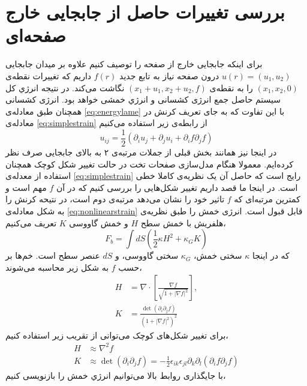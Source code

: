 \section{بررسی تغییرات حاصل از جابجایی خارج صفحه‌ای}
برای اینکه جابجایی خارج از صفحه را توصیف کنیم علاوه بر میدان جابجایی 
$u(r)=(u_1,u_2)$
درون صفحه نیاز به تابع جدید 
$f(r)$
داریم که تغییرات نقطه‌ی 
$(x_1,x_2,0)$
را به نقطه‌ی 
$(x_1+u_1,x_2+u_2,f)$
نگاشت می‌کند. در نتیجه انرژي کل سیستم حاصل جمع انرژی کشسانی و انرژي خمشی خواهد بود. انرژی کشسانی همچنان طبق معادله‌ی
\ref{eq:energylame}
با این تفاوت که به جای تعریف کرنش در معادله‌ی 
\ref{eq:simplestrain}
از رابطه‌ی زیر استفاده می‌کنیم
\begin{equation}
u_{ij}=\frac{1}{2}(\partial_iu_j+\partial_ju_i+\partial_if\partial_jf)
\label{eq:nonlinearstrain}
\end{equation}
در اینجا نیز همانند بخش قبلی از جملات مرتبه‌ی ۲ به بالای جابجایی صرف نظر کرده‌ایم. معمولا هنگام  مدل‌سازی صفحات تخت در حالت تغییر شکل کوچک همچنان استفاده از معدله‌ی 
\ref{eq:simplestrain}
رایج است که حاصل آن یک نظریه‌ی کاملا خطی است. در اینجا ما قصد داریم تغییر شکل‌هایی را بررسی کنیم که در آن $f$ مهم است و کمترین مرتبه‌ای که $f$ 
تاثیر خود را نشان می‌دهد مرتبه‌ی دوم است، در نتیحه کرنش را به شکل  معادله‌ی 
\ref{eq:nonlinearstrain}
قابل قبول است. انرژی خمش را طبق نظریه‌ی هلفریش
\cite{Helfrich1973}
با خمش سطح $H$
و خمش گاووسی $K$
تعریف می‌کنیم، 
\begin{equation}
F_b=\int dS\left(\frac{1}{2}\kappa H^2+\kappa_GK\right)
\end{equation}
که در اینجا $\kappa$
سختی خمش، $\kappa_G$
سختی گاووسی، و $dS$
عنصر سطح است. خم‌ها بر حسب $f$ به شکل زیر محاسبه می‌شوند،
\begin{equation}
\begin{aligned}
H&=\nabla\cdot\left[\frac{\nabla f}{\sqrt{1+|\nabla f|^2}}\right],\\
K&=\frac{\det(\partial_i\partial_jf)}{\left(1+|\nabla f|^2\right)^2}
\end{aligned}
\end{equation}
برای تغییر شکل‌های کوچک می‌توانی از تقریب زیر استفاده کنیم،
\begin{equation}
\begin{aligned}
H&\approx\nabla^2f\\
K&\approx \det(\partial_i\partial_jf)=-\frac{1}{2}\epsilon_{ik}\epsilon_{jl}\partial_k\partial_l(\partial_if\partial_jf)
\end{aligned}
\end{equation}
با جایگذاری روابط بالا می‌توانیم انرژي خمش را بازنویسی کنیم،
